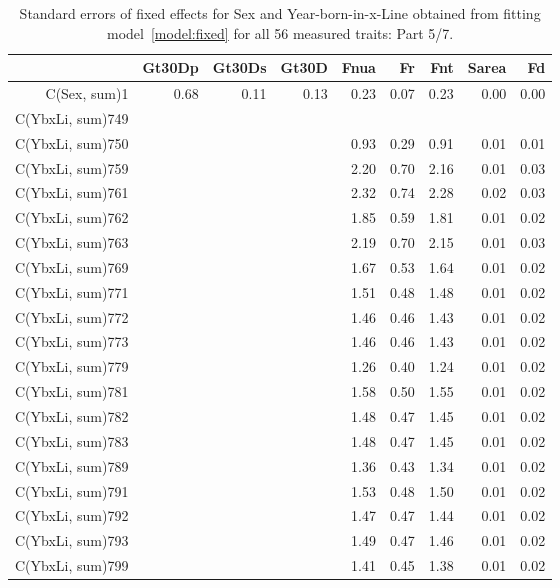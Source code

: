 \begin{table}[p]
\centering
\caption{Standard errors of fixed effects for Sex and Year-born-in-x-Line obtained from fitting model~\ref{model:fixed} for all 56 measured traits: Part 5/7.}
\label{tab:seb5}
\begin{tabular}{rrrrrrrrr}
  \hline
 & Gt30Dp & Gt30Ds & Gt30D & Fnua & Fr & Fnt & Sarea & Fd \\ 
  \hline
C(Sex, sum)1 & 0.68 & 0.11 & 0.13 & 0.23 & 0.07 & 0.23 & 0.00 & 0.00 \\ 
  C(YbxLi, sum)749 &  &  &  &  &  &  &  &  \\ 
  C(YbxLi, sum)750 &  &  &  & 0.93 & 0.29 & 0.91 & 0.01 & 0.01 \\ 
  C(YbxLi, sum)759 &  &  &  & 2.20 & 0.70 & 2.16 & 0.01 & 0.03 \\ 
  C(YbxLi, sum)761 &  &  &  & 2.32 & 0.74 & 2.28 & 0.02 & 0.03 \\ 
  C(YbxLi, sum)762 &  &  &  & 1.85 & 0.59 & 1.81 & 0.01 & 0.02 \\ 
  C(YbxLi, sum)763 &  &  &  & 2.19 & 0.70 & 2.15 & 0.01 & 0.03 \\ 
  C(YbxLi, sum)769 &  &  &  & 1.67 & 0.53 & 1.64 & 0.01 & 0.02 \\ 
  C(YbxLi, sum)771 &  &  &  & 1.51 & 0.48 & 1.48 & 0.01 & 0.02 \\ 
  C(YbxLi, sum)772 &  &  &  & 1.46 & 0.46 & 1.43 & 0.01 & 0.02 \\ 
  C(YbxLi, sum)773 &  &  &  & 1.46 & 0.46 & 1.43 & 0.01 & 0.02 \\ 
  C(YbxLi, sum)779 &  &  &  & 1.26 & 0.40 & 1.24 & 0.01 & 0.02 \\ 
  C(YbxLi, sum)781 &  &  &  & 1.58 & 0.50 & 1.55 & 0.01 & 0.02 \\ 
  C(YbxLi, sum)782 &  &  &  & 1.48 & 0.47 & 1.45 & 0.01 & 0.02 \\ 
  C(YbxLi, sum)783 &  &  &  & 1.48 & 0.47 & 1.45 & 0.01 & 0.02 \\ 
  C(YbxLi, sum)789 &  &  &  & 1.36 & 0.43 & 1.34 & 0.01 & 0.02 \\ 
  C(YbxLi, sum)791 &  &  &  & 1.53 & 0.48 & 1.50 & 0.01 & 0.02 \\ 
  C(YbxLi, sum)792 &  &  &  & 1.47 & 0.47 & 1.44 & 0.01 & 0.02 \\ 
  C(YbxLi, sum)793 &  &  &  & 1.49 & 0.47 & 1.46 & 0.01 & 0.02 \\ 
  C(YbxLi, sum)799 &  &  &  & 1.41 & 0.45 & 1.38 & 0.01 & 0.02 \\ 

\end{tabular}
\end{table}
